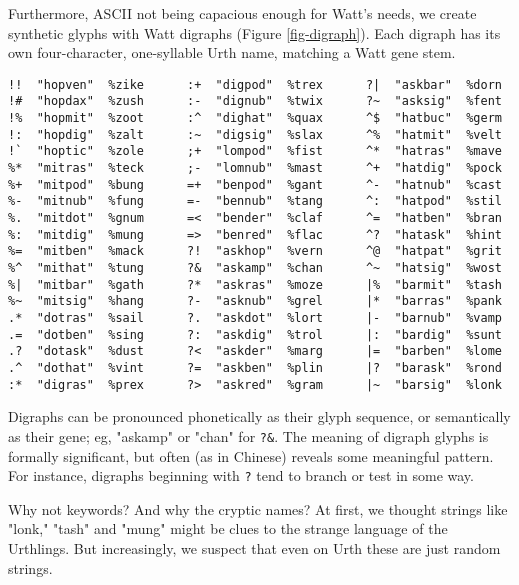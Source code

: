 \documentclass[10pt, nocopyrightspace]{sigplanconf}
\begin{document}
Furthermore, ASCII not being capacious enough for Watt's needs,
we create synthetic glyphs with Watt digraphs (Figure
\ref{fig-digraph}).  Each digraph has its own four-character,
one-syllable Urth name, matching a Watt gene stem.

\begin{figure*}
\begin{center}
\makebox[\textwidth]{\hrulefill}
\begin{verbatim}
!!  "hopven"  %zike      :+  "digpod"  %trex      ?|  "askbar"  %dorn
!#  "hopdax"  %zush      :-  "dignub"  %twix      ?~  "asksig"  %fent
!%  "hopmit"  %zoot      :^  "dighat"  %quax      ^$  "hatbuc"  %germ
!:  "hopdig"  %zalt      :~  "digsig"  %slax      ^%  "hatmit"  %velt
!`  "hoptic"  %zole      ;+  "lompod"  %fist      ^*  "hatras"  %mave
%*  "mitras"  %teck      ;-  "lomnub"  %mast      ^+  "hatdig"  %pock
%+  "mitpod"  %bung      =+  "benpod"  %gant      ^-  "hatnub"  %cast
%-  "mitnub"  %fung      =-  "bennub"  %tang      ^:  "hatpod"  %stil
%.  "mitdot"  %gnum      =<  "bender"  %claf      ^=  "hatben"  %bran
%:  "mitdig"  %mung      =>  "benred"  %flac      ^?  "hatask"  %hint
%=  "mitben"  %mack      ?!  "askhop"  %vern      ^@  "hatpat"  %grit
%^  "mithat"  %tung      ?&  "askamp"  %chan      ^~  "hatsig"  %wost
%|  "mitbar"  %gath      ?*  "askras"  %moze      |%  "barmit"  %tash
%~  "mitsig"  %hang      ?-  "asknub"  %grel      |*  "barras"  %pank
.*  "dotras"  %sail      ?.  "askdot"  %lort      |-  "barnub"  %vamp
.=  "dotben"  %sing      ?:  "askdig"  %trol      |:  "bardig"  %sunt
.?  "dotask"  %dust      ?<  "askder"  %marg      |=  "barben"  %lome
.^  "dothat"  %vint      ?=  "askben"  %plin      |?  "barask"  %rond
:*  "digras"  %prex      ?>  "askred"  %gram      |~  "barsig"  %lonk
\end{verbatim}
\end{center}
\caption{Urth digraphs}
\label{fig-digraph}
\end{figure*}

Digraphs can be pronounced phonetically as their glyph sequence,
or semantically as their gene; eg, "askamp" or "chan" for
\verb|?&|.  The meaning of digraph glyphs is formally
significant, but often (as in Chinese) reveals some meaningful
pattern.  For instance, digraphs beginning with \verb|?| tend to
branch or test in some way.

Why not keywords?  And why the cryptic names?  At first, we
thought strings like "lonk," "tash" and "mung" might be clues to
the strange language of the Urthlings.  But increasingly, we 
suspect that even on Urth these are just random strings.
\end{document}
